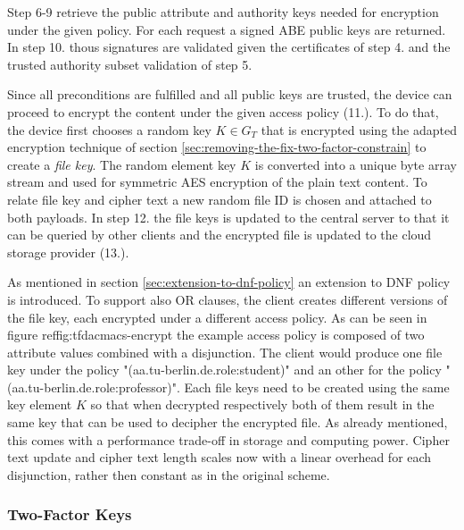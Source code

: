 Step 6-9 retrieve the public attribute and authority keys needed for encryption under the given policy. For each request a signed ABE public keys are returned. In step 10. thous signatures are validated given the certificates of step 4. and the trusted authority subset validation of step 5. 

Since all preconditions are fulfilled and all public keys are trusted, the device can proceed to encrypt the content under the given access policy (11.).  To do that, the device first chooses a random key  $K \in G_T$ that is encrypted using the adapted encryption technique of section \ref{sec:removing-the-fix-two-factor-constrain} to create a \textit{file key}. The random element key $K$ is converted into a unique byte array stream and used for symmetric \ac{AES} encryption of the plain text content. To relate file key and cipher text a new random file ID is chosen and attached to both payloads. In step 12. the file keys is updated to the central server to that it can be queried by other clients and the encrypted file is updated to the cloud storage provider (13.). 

As mentioned in section \ref{sec:extension-to-dnf-policy} an extension to DNF policy is introduced. To support also OR clauses, the client creates different versions of the file key, each encrypted under a different access policy. As can be seen in figure ref{fig:tfdacmacs-encrypt} the example access policy is composed of two attribute values combined with a disjunction. The client would produce one file key under the policy "(aa.tu-berlin.de.role:student)" and an other for the policy "(aa.tu-berlin.de.role:professor)". Each file keys need to be created using the same key element $K$ so that when decrypted respectively both of them result in the same key that can be used to decipher the encrypted file. As already mentioned, this comes with a performance trade-off in storage and computing power. Cipher text update and cipher text length scales now with a linear overhead for each disjunction, rather then constant as in the original scheme. 

\subsubsection{Two-Factor Keys}

 
